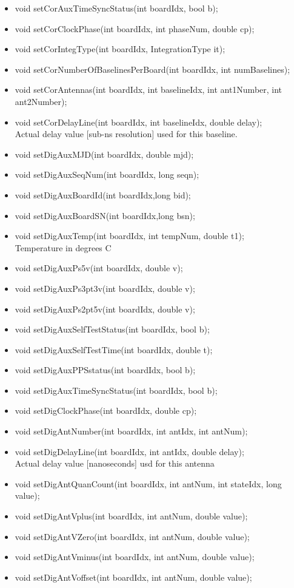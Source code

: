 \documentclass[11pt]{article}
\begin{document}
\begin{itemize}
\item    void setCorAuxTimeSyncStatus(int boardIdx, bool b);
\item    void setCorClockPhase(int boardIdx, int phaseNum, double cp);
\item    void setCorIntegType(int boardIdx, IntegrationType it);
\item    void setCorNumberOfBaselinesPerBoard(int boardIdx, int numBaselines);
\item    void setCorAntennas(int boardIdx, int baselineIdx, int ant1Number, int ant2Number);
\item    void setCorDelayLine(int boardIdx, int baselineIdx, double delay); \\
         Actual delay value [sub-ns resolution] used for this baseline.
\item    void setDigAuxMJD(int boardIdx, double mjd);
\item    void setDigAuxSeqNum(int boardIdx, long seqn);
\item    void setDigAuxBoardId(int boardIdx,long bid);
\item    void setDigAuxBoardSN(int boardIdx,long bsn);
\item    void setDigAuxTemp(int boardIdx, int tempNum, double t1); \\
         Temperature in degrees C
\item    void setDigAuxPs5v(int boardIdx, double v);
\item    void setDigAuxPs3pt3v(int boardIdx, double v);
\item    void setDigAuxPs2pt5v(int boardIdx, double v);
\item    void setDigAuxSelfTestStatus(int boardIdx, bool b);
\item    void setDigAuxSelfTestTime(int boardIdx, double t);
\item    void setDigAuxPPSstatus(int boardIdx, bool b);
\item    void setDigAuxTimeSyncStatus(int boardIdx, bool b);
\item    void setDigClockPhase(int boardIdx, double cp);
\item    void setDigAntNumber(int boardIdx, int antIdx, int antNum);
\item    void setDigDelayLine(int boardIdx, int antIdx, double delay); \\
         Actual delay value [nanoseconds] usd for this antenna
\item    void setDigAntQuanCount(int boardIdx, int antNum, int stateIdx, long value);
\item    void setDigAntVplus(int boardIdx, int antNum, double value);
\item    void setDigAntVZero(int boardIdx, int antNum, double value);
\item    void setDigAntVminus(int boardIdx, int antNum, double value);
\item    void setDigAntVoffset(int boardIdx, int antNum, double value);
\end{itemize}
\end{document}

